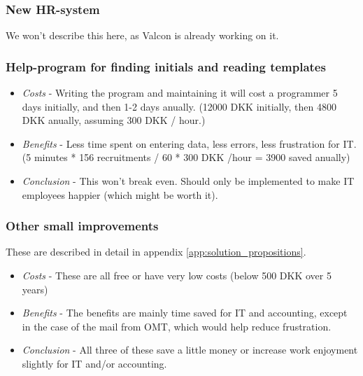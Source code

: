 \subsubsection{New HR-system}
We won't describe this here, as Valcon is already working on it.

\subsubsection{Help-program for finding initials and reading templates}
\begin{itemize}
	\item \emph{Costs} - Writing the program and maintaining it will cost a programmer 5 days initially, and then 1-2 days anually. (12000 DKK initially, then 4800 DKK anually, assuming 300 DKK / hour.)
	\item \emph{Benefits} - Less time spent on entering data, less errors, less frustration for IT. (5 minutes * 156 recruitments / 60 * 300 DKK /hour = 3900 saved anually)
	\item \emph{Conclusion} - This won't break even. Should only be implemented to make IT employees happier (which might be worth it).
\end{itemize}

\subsubsection{Other small improvements}
These are described in detail in appendix \ref{app:solution_propositions}.
\begin{itemize}
	\item \emph{Costs} - These are all free or have very low costs (below 500 DKK over 5 years)
	\item \emph{Benefits} - The benefits are mainly time saved for IT and accounting, except in the case of the mail from OMT, which would help reduce frustration.
	\item \emph{Conclusion} - All three of these save a little money or increase work enjoyment slightly for IT and/or accounting.
\end{itemize}